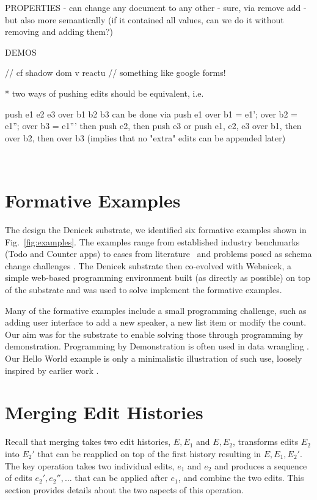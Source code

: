 \documentclass[sigconf,anonymous,screen]{acmart}
\begin{document}
PROPERTIES
- can change any document to any other - sure, via remove add - but also more semantically
(if it contained all values, can we do it without removing and adding them?)

DEMOS

// cf shadow dom v reactu
// something like google forms!

* two ways of pushing edits should be equivalent, i.e.

push e1 e2 e3 over b1 b2 b3 can be done via
  push e1 over b1 = e1'; over b2 = e1''; over b3 = e1'''
  then push e2, then push e3
or
  push e1, e2, e3 over b1, then over b2, then over b3
(implies that no "extra" edits can be appended later)






\newpage
~
\newpage



\appendix
\section{Formative Examples}
\label{app:examples}

The design the Denicek substrate, we identified six formative examples shown in
Fig.~\ref{fig:examples}. The examples range from established industry benchmarks
(Todo and Counter apps) to cases from literature~\cite{edwards-2022-copypaste} and
problems posed as schema change challenges \cite{edwards-2025-schema}.
The Denicek substrate then co-evolved with Webnicek, a simple web-based programming environment
built (as directly as possible) on top of the substrate and was used to solve implement the
formative examples.

Many of the formative examples include a small programming challenge, such as adding
user interface to add a new speaker, a new list item or modify the count. Our aim was for
the substrate to enable solving  those through programming by demonstration.
Programming by Demonstration is often used in data wrangling
\cite{gulwani-2012-spreadsheet,drossos-2020-wrex,gulwani-2014-flash}. Our Hello World example
is only a minimalistic illustration of such use, loosely inspired by earlier work \cite{miller-2001-simult}.

\section{Merging Edit Histories}
Recall that merging takes two edit histories, $E, E_1$ and $E, E_2$,
transforms edits $E_2$ into $E_2'$ that can be reapplied on top of the first history
resulting in $E, E_1, E_2'$. The key operation takes two individual edits, $e_1$ and $e_2$
and produces a sequence of edits $e_2', e_2'', \ldots$ that can be applied after $e_1$,
and combine the two edits. This section provides details about the two aspects of this operation.
\end{document}
